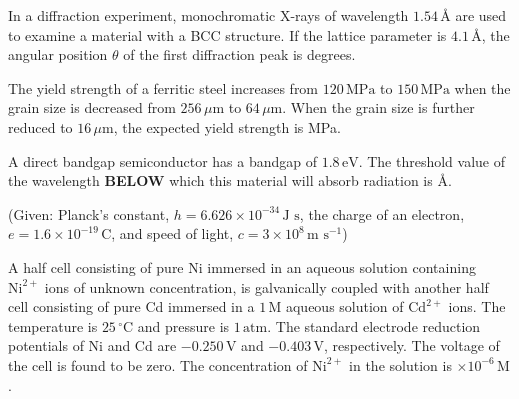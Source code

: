\iffalse
\chapter{2016}
\section{xe}
\author{EE24BTECH11030}
\fi
    \item In a diffraction experiment, monochromatic X-rays of wavelength $1.54 \, \text{\AA}$ are used to examine a material with a BCC structure. If the lattice parameter is $4.1 \, \text{\AA}$, the angular position $\theta$ of the first diffraction peak is \underline{\hspace{1cm}} degrees.
    
    \bigskip
    
    \item The yield strength of a ferritic steel increases from $120 \, \text{MPa}$ to $150 \, \text{MPa}$ when the grain size is decreased from $256 \, \mu\text{m}$ to $64 \, \mu\text{m}$. When the grain size is further reduced to $16 \, \mu\text{m}$, the expected yield strength is \underline{\hspace{1cm}} MPa.
    
    \bigskip

    \item A direct bandgap semiconductor has a bandgap of $1.8 \, \text{eV}$. The threshold value of the wavelength {\textbf{BELOW}} which this material will absorb radiation is \underline{\hspace{1cm}} $\text{\AA}$.
    
    (Given: Planck's constant, $h = 6.626 \times 10^{-34} \, \text{J s}$, the charge of an electron, $e = 1.6 \times 10^{-19} \, \text{C}$, and speed of light, $c = 3 \times 10^8 \, \text{m s}^{-1}$)
    
    \bigskip

    \item A half cell consisting of pure Ni immersed in an aqueous solution containing $\text{Ni}^{2+}$ ions of unknown concentration, is galvanically coupled with another half cell consisting of pure Cd immersed in a $1 \, \text{M}$ aqueous solution of $\text{Cd}^{2+}$ ions. The temperature is $25 \, ^\circ \text{C}$ and pressure is $1 \, \text{atm}$. The standard electrode reduction potentials of Ni and Cd are $-0.250 \, \text{V}$ and $-0.403 \, \text{V}$, respectively. The voltage of the cell is found to be zero. The concentration of $\text{Ni}^{2+}$ in the solution is \underline{\hspace{1cm}} $\times 10^{-6} \, \text{M}$.
    
